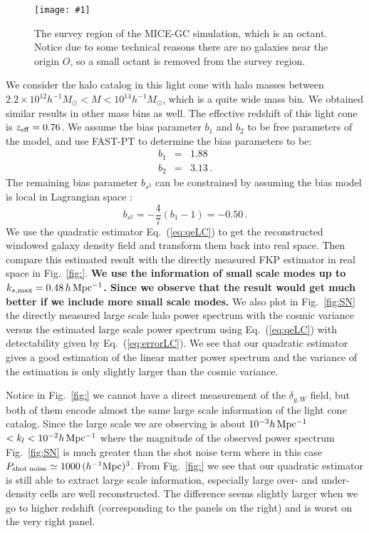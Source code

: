 \documentclass[prd,amsmath,amssymb,floatfix,superscriptaddress,nofootinbib,twocolumn]{revtex4-1}
\def\be{\begin{equation}}
\def\ee{\end{equation}}
\def\bea{\begin{eqnarray}}
\def\eea{\end{eqnarray}}
\newcommand{\vs}{\nonumber\\}
\newcommand{\ec}[1]{Eq.~(\ref{eq:#1})}
\newcommand{\rf}[1]{\ref{fig:#1}}
\newcommand{\sfig}[2]{
\texttt{[image: \#1]}
        }
\newcommand{\Sfig}[2]{
   \begin{figure}[thbp]
   \begin{center}
    \sfig{#1.pdf}{\columnwidth}
    \caption{{\small #2}}
    \label{fig:#1}
     \end{center}
   \end{figure}
}
\begin{document}
\Sfig{octant}{The survey region of the MICE-GC simulation, which is an octant. Notice due to some technical reasons there are no galaxies near the origin $O$, so a small octant is removed from the survey region.}

We consider the halo catalog in this light cone with halo masses between $2.2\times 10^{12}h^{-1}M_{\odot}<M<10^{14}h^{-1}M_{\odot}$, which is a quite wide mass bin. We obtained similar results in other mass bins as well. The effective redshift of this light cone is $z_{\rm eff}=0.76$. We assume the bias parameter $b_{1}$ and $b_{2}$ to be free parameters of the model, and use FAST-PT \cite{McEwen:2016fjn} to determine the bias parameters to be:
\bea 
b_1&=&1.88\vs
b_2&=&3.13\,.
\eea
The remaining bias parameter $b_{s^2}$ can be constrained by assuming the bias model is local in Lagrangian space \cite{Baldauf:2012hs}:
\be 
b_{s^2}=-\frac{4}{7}(b_1-1)=-0.50\,.
\ee 
We use the quadratic estimator \ec{qeLC} to get the reconstructed windowed galaxy density field and transform them back into real space. Then compare this estimated result with the directly measured FKP estimator in real space in Fig.~\rf{}. \textbf{We use the information of small scale modes up to $k_{s,\rm max}=0.48\,h\,\rm Mpc^{-1}$. Since we observe that the result would get much better if we include more small scale modes.} We also plot in Fig.~\rf{SN} the directly measured large scale halo power spectrum with the cosmic variance versus the estimated large scale power spectrum using \ec{qeLC} with detectability given by \ec{errorLC}. We see that our quadratic estimator gives a good estimation of the linear matter power spectrum and the variance of the estimation is only slightly larger than the cosmic variance.

 Notice in Fig.~\rf{} we cannot have a direct measurement of the $\delta_{g,W}$ field, but both of them encode almost the same large scale information of the light cone catalog. Since the large scale we are observing is about $10^{-3}h\,\rm Mpc^{-1}$$<k_l<10^{-2}h\,\rm Mpc^{-1}$ where the magnitude of the observed power spectrum Fig.~\rf{SN} is much greater than the shot noise term where in this case $P_{\rm shot \; noise}\simeq 1000\,(h^{-1}\rm Mpc)^3$. From Fig.~\rf{} we see that our quadratic estimator is still able to extract large scale information, especially large over- and under-density cells are well reconstructed. The difference seems slightly larger when we go to higher redshift (corresponding to the panels on the right) and is worst on the very right panel.
 
\end{document}
